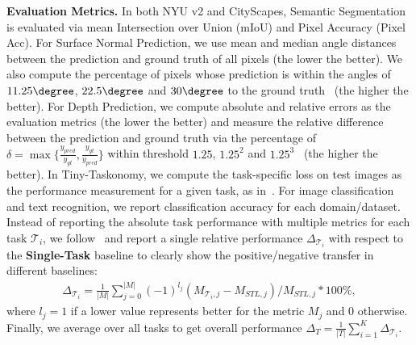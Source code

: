 \noindent\textbf{Evaluation Metrics.}\label{sec:evaluation_metrics}
In both NYU v2 and CityScapes, 
Semantic Segmentation is evaluated via mean Intersection over Union (mIoU) and Pixel Accuracy (Pixel Acc). For Surface Normal Prediction, we use mean and median angle distances between the prediction and ground truth of all pixels (the lower the better). We also compute the percentage of pixels whose prediction is within the angles of $11.25\degree$, $22.5\degree$ and $30\degree$ to the ground truth~\cite{eigen2015predicting} (the higher the better).
For Depth Prediction, we compute absolute and relative errors as the evaluation metrics (the
lower the better) and measure the relative difference between the prediction and ground truth via the percentage of $\delta = \max \{ \frac{y_{pred}}{y_{gt}}, \frac{y_{gt}}{y_{pred}}\}$ within threshold $1.25$, $1.25^2$ and $1.25^3$~\cite{eigen2014depth}  (the higher the better).  In Tiny-Taskonomy,
we compute the task-specific loss on test images as the performance measurement for a given task, as in~\cite{zamir2018taskonomy,standley2019tasks}. For image classification and text recognition, we report classification accuracy for each domain/dataset. Instead of reporting the absolute task performance with multiple metrics for each task $\mathcal{T}_i$, we follow~\cite{maninis2019attentive} and report a single relative performance $\Delta_{\mathcal{T}_i}$ with respect to the \textbf{Single-Task} baseline to clearly show the positive/negative transfer in different baselines:
\begin{align}
    \Delta_{\mathcal{T}_i} = \frac{1}{|M|}\sum_{j=0}^{|M|}(-1)^{l_j}(M_{\mathcal{T}_i,j} - M_{STL, j}) / M_{STL, j} * 100 \%,
\end{align}
where $l_j = 1$ if a lower value represents better for the metric $M_j$ and 0 otherwise.
Finally, we average over all tasks to get overall performance $\Delta_{T} = \frac{1}{|T|}\sum_{i=1}^{K} \Delta_{\mathcal{T}_i} $.


